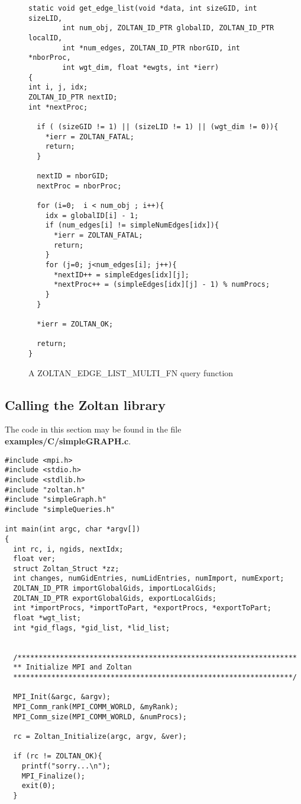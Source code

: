 \begin{figure}
\begin{flushleft}
\begin{verbatim}
static void get_edge_list(void *data, int sizeGID, int sizeLID,
        int num_obj, ZOLTAN_ID_PTR globalID, ZOLTAN_ID_PTR localID,
        int *num_edges, ZOLTAN_ID_PTR nborGID, int *nborProc,
        int wgt_dim, float *ewgts, int *ierr)
{
int i, j, idx;
ZOLTAN_ID_PTR nextID;
int *nextProc;

  if ( (sizeGID != 1) || (sizeLID != 1) || (wgt_dim != 0)){
    *ierr = ZOLTAN_FATAL;
    return;
  }

  nextID = nborGID;
  nextProc = nborProc;

  for (i=0;  i < num_obj ; i++){
    idx = globalID[i] - 1;
    if (num_edges[i] != simpleNumEdges[idx]){
      *ierr = ZOLTAN_FATAL;
      return;
    }
    for (j=0; j<num_edges[i]; j++){
      *nextID++ = simpleEdges[idx][j];
      *nextProc++ = (simpleEdges[idx][j] - 1) % numProcs;
    }
  }

  *ierr = ZOLTAN_OK;

  return;
}
\end{verbatim}
\end{flushleft}
\caption{A ZOLTAN\_EDGE\_LIST\_MULTI\_FN query function}
\label{fig:EdgeListMulti}
\end{figure}

\clearpage

\subsection{Calling the Zoltan library}

The code in this section may be found in the file \textbf{examples/C/simpleGRAPH.c}.

\begin{flushleft}
\begin{verbatim}
#include <mpi.h>
#include <stdio.h>
#include <stdlib.h>
#include "zoltan.h"
#include "simpleGraph.h"
#include "simpleQueries.h"

int main(int argc, char *argv[])
{
  int rc, i, ngids, nextIdx;
  float ver;
  struct Zoltan_Struct *zz;
  int changes, numGidEntries, numLidEntries, numImport, numExport;
  ZOLTAN_ID_PTR importGlobalGids, importLocalGids;
  ZOLTAN_ID_PTR exportGlobalGids, exportLocalGids;
  int *importProcs, *importToPart, *exportProcs, *exportToPart;
  float *wgt_list;
  int *gid_flags, *gid_list, *lid_list;


  /******************************************************************
  ** Initialize MPI and Zoltan
  ******************************************************************/

  MPI_Init(&argc, &argv);
  MPI_Comm_rank(MPI_COMM_WORLD, &myRank);
  MPI_Comm_size(MPI_COMM_WORLD, &numProcs);

  rc = Zoltan_Initialize(argc, argv, &ver);

  if (rc != ZOLTAN_OK){
    printf("sorry...\n");
    MPI_Finalize();
    exit(0);
  }
\end{verbatim}
\end{flushleft}

